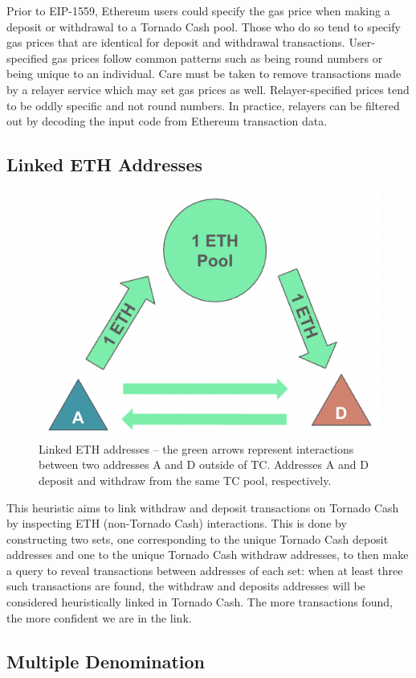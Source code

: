 Prior to EIP-1559, Ethereum users could specify the gas price when making a deposit or withdrawal to a Tornado Cash pool. Those who do so tend to specify gas prices that are identical for deposit and withdrawal transactions. User-specified gas prices follow common patterns such as being round numbers or being unique to an individual. Care must be taken to remove transactions made by a relayer service which may set gas prices as well. Relayer-specified prices tend to be oddly specific and not round numbers. In practice, relayers can be filtered out by decoding the input code from Ethereum transaction data.

\subsection{Linked ETH Addresses}

\begin{figure}[h!]
\centering
\includegraphics[width=0.6\linewidth]{figures/tcash/h3.png}
\caption{Linked ETH addresses -- the green arrows represent interactions between two addresses A and D outside of TC. Addresses A and D deposit and withdraw from the same TC pool, respectively.}
\label{fig:tornado}
\end{figure}

This heuristic aims to link withdraw and deposit transactions on Tornado Cash by inspecting ETH (non-Tornado Cash) interactions. This is done by constructing two sets, one corresponding to the unique Tornado Cash deposit addresses and one to the unique Tornado Cash withdraw addresses, to then make a query to reveal transactions between addresses of each set: when at least three such transactions are found, the withdraw and deposits addresses will be considered heuristically linked in Tornado Cash. The more transactions found, the more confident we are in the link.

\subsection{Multiple Denomination}

